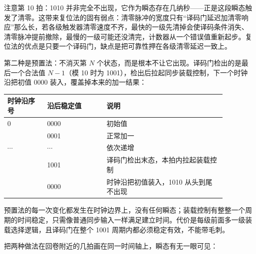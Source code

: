 注意第 10 拍：1010 并非完全不出现，它作为瞬态存在几纳秒——正是这段瞬态触发了清零。这带来复位法的固有弱点：清零脉冲的宽度只有“译码门延迟加清零响应”那么长，若各级触发器清零速度不齐，最快的一级先清掉会使译码条件消失、清零脉冲提前撤除，最慢的一级可能还没清完，计数器从一个错误值重新起步。复位法的优点是只要一个译码门，缺点是把可靠性押在各级清零延迟一致上。

第二种是预置法：不消灭第 $N$ 个状态，而是根本不让它出现。译码门检出的是最后一个合法值 $N-1$（模 10 时为 1001），检出后拉起同步装载控制，下一个时钟沿把初值 0000 装入，覆盖掉本来的加一结果：

\begin{longtable}{L{0.16\linewidth}L{0.24\linewidth}L{0.48\linewidth}}
\toprule
时钟沿序号 & 沿后稳定值 & 说明 \\
 & 0000 & 初始值 \\ & 0001 & 正常加一 \\\tablerowrule
$\cdots$ & $\cdots$ & 依次递增 \\ & 1001 & 译码门检出末态，本拍内拉起装载控制 \\ & 0000 & 时钟沿把初值装入，1010 从头到尾不出现 \\
\bottomrule
\end{longtable}

预置法的每一次变化都发生在时钟边界上，没有任何瞬态；装载控制有整整一个周期的时间稳定，只需像普通同步输入一样满足建立时间。代价是每级前面多一级装载选择逻辑，且译码门在整个 1001 周期内都必须稳定有效，不能带毛刺。

把两种做法在回卷附近的几拍画在同一时间轴上，瞬态有无一眼可见：

